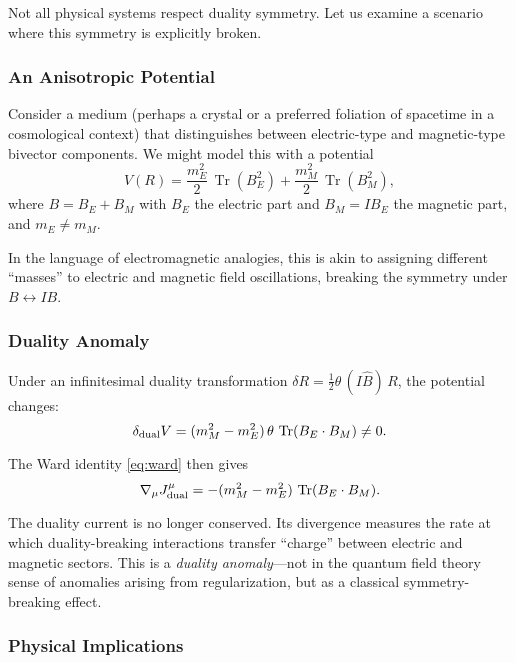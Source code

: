 \documentclass[11pt,a4paper]{article}
\numberwithin{equation}{section}
\theoremstyle{plain}
\theoremstyle{definition}
\theoremstyle{remark}
\DeclareMathOperator{\Tr}{Tr}
\begin{document}
Not all physical systems respect duality symmetry. Let us examine a scenario where this symmetry is explicitly broken.

\subsubsection{An Anisotropic Potential}

Consider a medium (perhaps a crystal or a preferred foliation of spacetime in a cosmological context) that distinguishes between electric-type and magnetic-type bivector components. We might model this with a potential
\begin{equation}
V(R) = \frac{m_E^2}{2}\,\Tr(B_E^2) + \frac{m_M^2}{2}\,\Tr(B_M^2),
\end{equation}
where $B = B_E + B_M$ with $B_E$ the electric part and $B_M = IB_E$ the magnetic part, and $m_E \neq m_M$.

In the language of electromagnetic analogies, this is akin to assigning different ``masses'' to electric and magnetic field oscillations, breaking the symmetry under $B \leftrightarrow IB$.

\subsubsection{Duality Anomaly}

Under an infinitesimal duality transformation $\delta R = \frac{1}{2}\theta\,(I\hat{B})\,R$, the potential changes:
\begin{equation}
\delta_{\rm dual} V = (m_M^2 - m_E^2)\,\theta\,\Tr(B_E\cdot B_M) \neq 0.
\end{equation}

The Ward identity \eqref{eq:ward} then gives
\begin{equation}
\nabla_\mu J^\mu_{\rm dual} = -(m_M^2 - m_E^2)\,\Tr(B_E\cdot B_M).
\end{equation}

The duality current is no longer conserved. Its divergence measures the rate at which duality-breaking interactions transfer ``charge'' between electric and magnetic sectors. This is a \emph{duality anomaly}---not in the quantum field theory sense of anomalies arising from regularization, but as a classical symmetry-breaking effect.

\subsubsection{Physical Implications}
\end{document}
